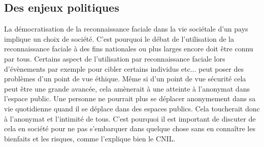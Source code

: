 \documentclass[12pt,french]{article}
\theoremstyle{plain}
\theoremstyle{definition}
\begin{document}
\subsection{Des enjeux politiques}
La démocratisation de la reconnaissance faciale dans la vie sociétale d'un pays implique un choix de société. C'est pourquoi le débat de l'utilisation de la reconnaissance faciale à des fins nationales ou plus larges encore doit être connu par tous. 
Certains aspect de l'utilisation par reconnaissance faciale lors d'évènements par exemple pour cibler certains individus etc... peut poser des problèmes d'un point de vue éthique.
Même si d'un point de vue sécurité cela peut être une grande avancée, cela amènerait à une atteinte à l'anonymat dans l'espace public. Une personne ne pourrait plus se déplacer anonymement dans sa vie quotidienne quand il se déplace dans des espaces publics. Cela toucherait donc à l'anonymat et l'intimité de tous. C'est pourquoi il est important de discuter de cela en société pour ne pas s'embarquer dans quelque chose sans en connaître les bienfaits et les risques, comme l'explique bien le CNIL.
\end{document}
